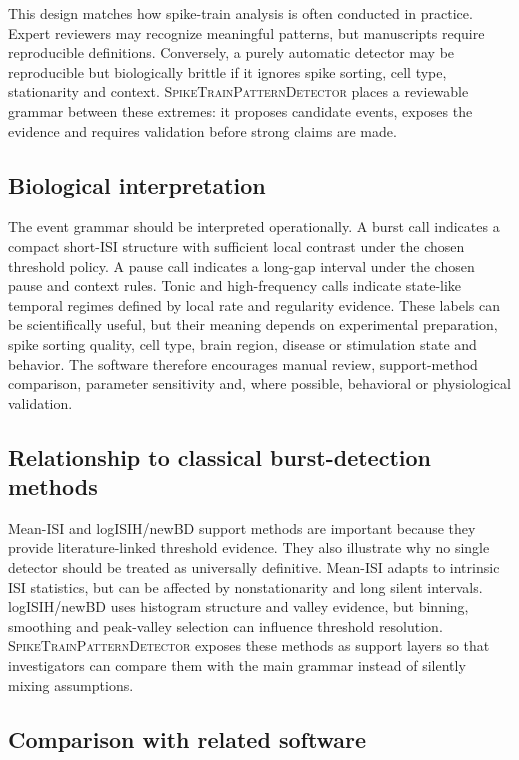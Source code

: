 \documentclass[pdflatex,sn-apa]{sn-jnl}
\newcommand{\stpd}{\textsc{SpikeTrainPatternDetector}}
\begin{document}
This design matches how spike-train analysis is often conducted in practice. Expert reviewers may recognize meaningful patterns, but manuscripts require reproducible definitions. Conversely, a purely automatic detector may be reproducible but biologically brittle if it ignores spike sorting, cell type, stationarity and context. \stpd{} places a reviewable grammar between these extremes: it proposes candidate events, exposes the evidence and requires validation before strong claims are made.

\subsection{Biological interpretation}

The event grammar should be interpreted operationally. A burst call indicates a compact short-ISI structure with sufficient local contrast under the chosen threshold policy. A pause call indicates a long-gap interval under the chosen pause and context rules. Tonic and high-frequency calls indicate state-like temporal regimes defined by local rate and regularity evidence. These labels can be scientifically useful, but their meaning depends on experimental preparation, spike sorting quality, cell type, brain region, disease or stimulation state and behavior. The software therefore encourages manual review, support-method comparison, parameter sensitivity and, where possible, behavioral or physiological validation.

\subsection{Relationship to classical burst-detection methods}

Mean-ISI and logISIH/newBD support methods are important because they provide literature-linked threshold evidence. They also illustrate why no single detector should be treated as universally definitive. Mean-ISI adapts to intrinsic ISI statistics, but can be affected by nonstationarity and long silent intervals. logISIH/newBD uses histogram structure and valley evidence, but binning, smoothing and peak-valley selection can influence threshold resolution. \stpd{} exposes these methods as support layers so that investigators can compare them with the main grammar instead of silently mixing assumptions.

\subsection{Comparison with related software}
\end{document}
